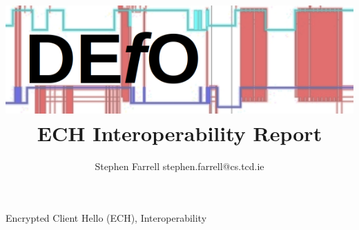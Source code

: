\documentclass[12pt,draftclsnofoot,onecolumn]{IEEEtran}
\begin{document}

\title{
\includegraphics[width=\textwidth]{defologo.png}
ECH Interoperability Report
}

\author{
Stephen Farrell stephen.farrell@cs.tcd.ie

}





\maketitle



\begin{IEEEkeywords}
Encrypted Client Hello (ECH), Interoperability
\end{IEEEkeywords}











\end{document}
